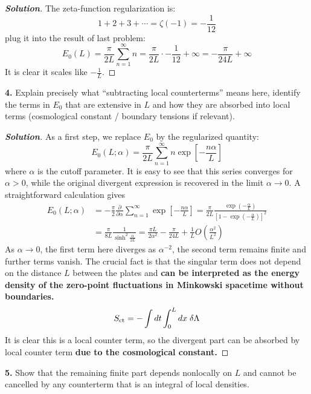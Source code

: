 \documentclass[11pt]{article}
\newenvironment{solution}[1][]{\begin{proof}[\textbf{Solution}]}{\end{proof}}
\begin{document}
\begin{solution}[17.3]
	The zeta-function regularization is:
	\[
	1+2+3+\cdots=\zeta(-1)=-\frac{1}{12}
	\]
	plug it into the result of last problem:
	\[
	E_0(L)=\frac{\pi}{2L}\sum_{n=1}^{\infty}n=\frac{\pi}{2L}\cdot-\frac{1}{12}+\infty=-\frac{\pi}{24L}+\infty
	\]
	It is clear it scales like $-\frac{1}{L}$.
\end{solution}
\begin{tcolorbox}[problem]
\textbf{4.} Explain precisely what ``subtracting local counterterms'' means here, identify the terms in $E_0$ that are extensive in $L$ and how they are absorbed into local terms (cosmological constant / boundary tensions if relevant).
\end{tcolorbox}
\begin{solution}[17.4]
	As a first step, we replace $E_0$ by the regularized quantity:
	\[
	E_0\left(L;\alpha\right)=\frac{\pi}{2L}\sum_{n=1}^\infty n\exp\left[-\frac{n\alpha}{L}\right]
	\]
	where $\alpha$ is the cutoff parameter. It is easy to see that this series converges for $\alpha>0$, while the original divergent expression is recovered in the limit $\alpha\to0$. A straightforward calculation gives
	\[
	\begin{aligned}
	E_0\left(L;\alpha\right)&=-\frac{\pi}{2}\frac{\partial}{\partial\alpha}\sum_{n=1}^\infty\exp\left[-\frac{n\alpha}{L}\right]=\frac{\pi}{2L}\frac{\exp\left(-\frac{\alpha}{L}\right)}{\left[1-\exp\left(-\frac{\alpha}{L}\right)\right]^2}\\
	&=\frac{\pi}{8L}\frac{1}{\sinh^2\frac{\alpha}{2L}}=\frac{\pi L}{2\alpha^2}-\frac{\pi}{24L}+\frac{1}{L}O\left(\frac{\alpha^2}{L^2}\right)
	\end{aligned}
	\]
	As $\alpha\to0$, the first term here diverges as $\alpha^{-2}$, the second term remains finite and further terms vanish. The crucial fact is that the singular term does not depend on the distance $L$ between the plates and \textbf{can be interpreted as the energy density of the zero-point fluctuations in Minkowski spacetime without boundaries.} 
	\[
	S_{\rm ct}=-\int dt\int_{0}^{L}dx\;\delta\Lambda
	\]
	It is clear this is a local counter term, so the divergent part can be absorbed by local counter term \textbf{due to the cosmological constant.}
\end{solution}
\begin{tcolorbox}[problem]
\textbf{5.} Show that the remaining finite part depends nonlocally on $L$ and cannot be cancelled by any counterterm that is an integral of local densities.
\end{tcolorbox}
\end{document}
